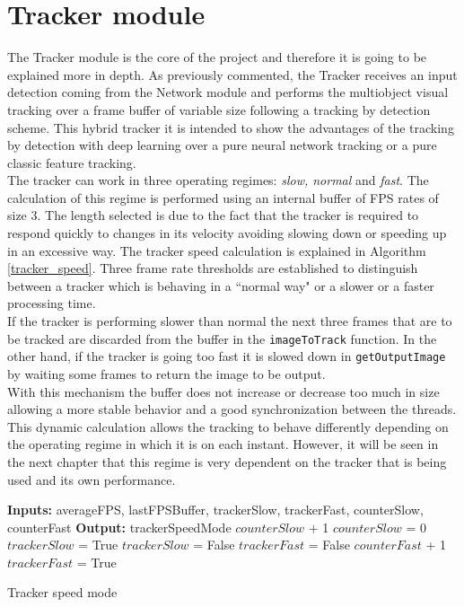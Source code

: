 \section{Tracker module}\label{tracker_algorithms}
The Tracker module is the core of the project and therefore it is going to be explained more in depth. As previously commented, the Tracker receives an input detection coming from the Network module and performs the multiobject visual tracking over a frame buffer of variable size following a tracking by detection scheme. This hybrid tracker it is intended to show the advantages of the tracking by detection with deep learning over a pure neural network tracking or a pure classic feature tracking.\\
The tracker can work in three operating regimes: \textit{slow, normal} and \textit{fast}. The calculation of this regime is performed using an internal buffer of FPS rates of size 3. The length selected is due to the fact that the tracker is required to respond quickly to changes in its velocity avoiding slowing down or speeding up in an excessive way. The tracker speed calculation is explained in Algorithm \ref{tracker_speed}. Three frame rate thresholds are established to distinguish between a tracker which is behaving in a ``normal way" or a slower or a faster processing time.\\ If the tracker is performing slower than normal the next three frames that are to be tracked are discarded from the buffer in the \texttt{imageToTrack} function. In the other hand, if the tracker is going too fast it is slowed down in \texttt{getOutputImage} by waiting some frames to return the image to be output.\\ With this mechanism the buffer does not increase or decrease too much in size allowing a more stable behavior and a good synchronization between the threads. This dynamic calculation allows the tracking to behave differently depending on the operating regime in which it is on each instant. However, it will be seen in the next chapter that this regime is very dependent on the tracker that is being used and its own performance.\\
\begin{algorithmic}[H]
\begin{algorithm}
\State \textbf{Inputs:} averageFPS, lastFPSBuffer, trackerSlow, trackerFast, counterSlow, counterFast
\State \textbf{Output:} trackerSpeedMode
    \State $counterSlow$ + 1
        \State $counterSlow$ = 0
        \State $trackerSlow$ = True
    \EndIf
{}
    \State $trackerSlow$ = False
    \State $trackerFast$ = False
    \State $counterFast$ + 1
\State $trackerFast$ = True
\EndIf  
\EndProcedure
\caption{Tracker speed mode}\label{tracker_speed}
\end{algorithm}
\end{algorithmic}

